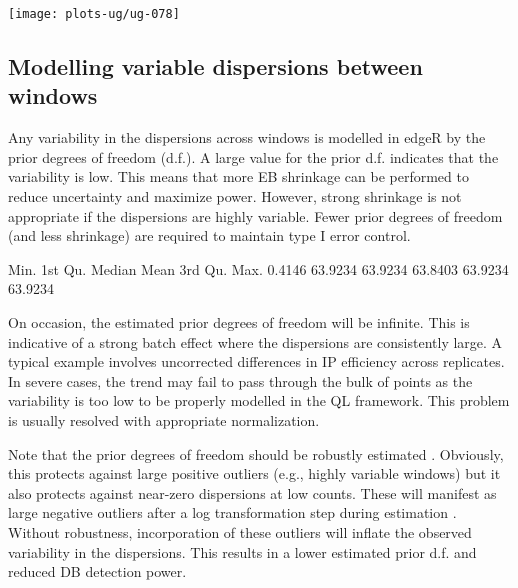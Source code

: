 \documentclass[12pt]{report}
\renewenvironment{Schunk}{\vspace{0pt}}{\vspace{0pt}}
\newcommand{\edger}{edgeR}
\begin{document}
\begin{center}
\texttt{[image: plots-ug/ug-078]}
\end{center}

\subsection{Modelling variable dispersions between windows}
Any variability in the dispersions across windows is modelled in \edger{} by the prior degrees of freedom (d.f.).
A large value for the prior d.f. indicates that the variability is low. 
This means that more EB shrinkage can be performed to reduce uncertainty and maximize power. 
However, strong shrinkage is not appropriate if the dispersions are highly variable. 
Fewer prior degrees of freedom (and less shrinkage) are required to maintain type I error control. 

\begin{Schunk}
\begin{Soutput}
   Min. 1st Qu.  Median    Mean 3rd Qu.    Max. 
 0.4146 63.9234 63.9234 63.8403 63.9234 63.9234 
\end{Soutput}
\end{Schunk}

On occasion, the estimated prior degrees of freedom will be infinite. 
This is indicative of a strong batch effect where the dispersions are consistently large.
A typical example involves uncorrected differences in IP efficiency across replicates. 
In severe cases, the trend may fail to pass through the bulk of points as the variability is too low to be properly modelled in the QL framework.
This problem is usually resolved with appropriate normalization.

Note that the prior degrees of freedom should be robustly estimated \citep{phipson2016}. 
Obviously, this protects against large positive outliers (e.g., highly variable windows) but it also protects against near-zero dispersions at low counts. 
These will manifest as large negative outliers after a log transformation step during estimation \citep{smyth2004}. 
Without robustness, incorporation of these outliers will inflate the observed variability in the dispersions.
This results in a lower estimated prior d.f. and reduced DB detection power.

\end{document}
